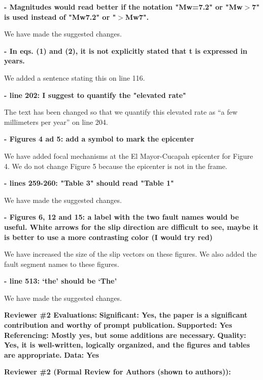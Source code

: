 \documentclass[10pt,a4paper]{letter}
\begin{document}
\begin{letter}{}
\textbf{- Magnitudes would read better if the notation "Mw=7.2" or "Mw$>$7" is used instead of "Mw7.2" or "$>$Mw7".}

We have made the suggested changes.

\textbf{- In eqs. (1) and (2), it is not explicitly stated that t is expressed in years.}

We added a sentence stating this on line 116.

\textbf{- line 202: I suggest to quantify the "elevated rate"}

The text has been changed so that we quantify this elevated rate as “a few millimeters per year” on line 204.

\textbf{- Figures 4 ad 5: add a symbol to mark the epicenter}

We have added focal mechanisms at the El Mayor-Cucapah epicenter for Figure 4.  We do not change Figure 5 because the epicenter is not in the frame.

\textbf{- lines 259-260: "Table 3" should read "Table 1"}

We have made the suggested changes.

\textbf{- Figures 6, 12 and 15: a label with the two fault names would be useful. White arrows for the slip direction are difficult to see, maybe it is better to use a more contrasting color (I would try red)}

We have increased the size of the slip vectors on these figures. We also added the fault segment names to these figures.

\textbf{- line 513: `the' should be `The'}

We have made the suggested changes.

\textbf{Reviewer \#2 Evaluations:}\newline
\textbf{Significant: Yes, the paper is a significant contribution and worthy of prompt publication.}\newline
\textbf{Supported: Yes}\newline
\textbf{Referencing: Mostly yes, but some additions are necessary.}\newline
\textbf{Quality: Yes, it is well-written, logically organized, and the figures and tables are appropriate.}\newline
\textbf{Data: Yes}

\textbf{Reviewer \#2 (Formal Review for Authors (shown to authors)):}


\end{letter}
\end{document}
